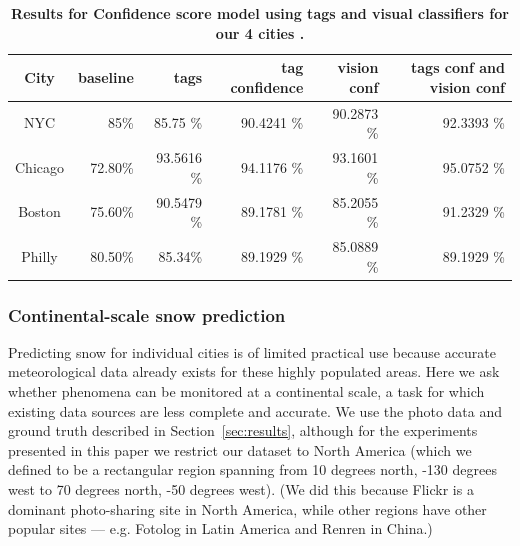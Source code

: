 \begin{table}\centering
{}
\caption {\textbf{Results for Confidence score model using tags and visual classifiers for our 4 cities .}}
\label{tab:city_conf_tag_vision} 
\begin{tabular}{@{}crrrrr@{}}\toprule
City &  baseline & tags  &  tag confidence  &  vision conf & tags conf and vision conf \\\midrule
{NYC} & 85\% & 85.75 \% &90.4241 \%&90.2873 \% &92.3393 \%\\
{Chicago} &72.80\% & 93.5616 \% &94.1176 \% &93.1601 \% &95.0752 \%  \\
{Boston} & 75.60\%& 90.5479 \% &89.1781 \%&85.2055 \% & 91.2329 \% \\
{Philly} & 80.50\% & 85.34\% & 89.1929 \% &85.0889 \%	 & 89.1929 \%  \\
\bottomrule
\end{tabular}
\vspace{-12pt}
\end{table}

\subsubsection{{Continental-scale snow prediction}}
Predicting snow for individual cities is of limited practical use because accurate meteorological data already exists for these highly populated areas.
Here we ask whether phenomena can be
monitored at a continental scale, a task for which existing data
sources are less complete and accurate.  We use the photo data and
ground truth described in Section~\ref{sec:results}, although for the
experiments presented in this paper we restrict our dataset to North
America (which we defined to be a rectangular region spanning from 10
degrees north, -130 degrees west to 70 degrees north, -50 degrees
west). (We did this because Flickr is a dominant photo-sharing site in
North America, while other regions have other popular
sites --- e.g. Fotolog in Latin America and Renren in China.)  


